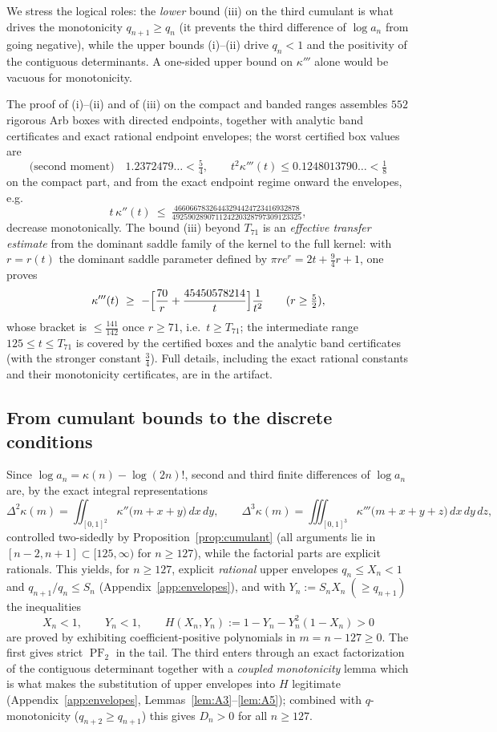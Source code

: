 \documentclass[11pt]{amsart}
\theoremstyle{definition}
\theoremstyle{remark}
\DeclareMathOperator{\PF}{PF}
\begin{document}
We stress the logical roles: the \emph{lower} bound (iii) on the third
cumulant is what drives the monotonicity $q_{n+1}\ge q_n$ (it prevents
the third difference of $\log a_n$ from going negative), while the
upper bounds (i)--(ii) drive $q_n<1$ and the positivity of the
contiguous determinants. A one-sided upper bound on $\kappa'''$ alone
would be vacuous for monotonicity.

The proof of (i)--(ii) and of (iii) on the compact and banded ranges
assembles $552$ rigorous Arb boxes with directed endpoints, together
with analytic band certificates and exact rational endpoint envelopes;
the worst certified box values are
\[
\text{(second moment)}\quad 1.2372479\ldots<\tfrac54,
\qquad
t^2\kappa'''(t)\le 0.1248013790\ldots<\tfrac18
\]
on the compact part, and from the exact endpoint regime onward the
envelopes, e.g.
\[
t\,\kappa''(t)\ \le\
\tfrac{46606678326443294424723416932878}
{492590289071124220328797309123325},
\]
decrease monotonically. The bound (iii) beyond $T_{71}$ is an
\emph{effective transfer estimate} from the dominant saddle family of
the kernel to the full kernel: with $r=r(t)$ the dominant saddle
parameter defined by $\pi r e^{r}=2t+\tfrac94 r+1$, one proves
\[
\kappa'''(t)\ \ge\ -\Bigl[\frac{70}{r}+\frac{45450578214}{t}\Bigr]
\frac{1}{t^{2}}\qquad (r\ge\tfrac52),
\]
whose bracket is $\le\frac{141}{142}$ once $r\ge 71$, i.e.\ $t\ge
T_{71}$; the intermediate range $125\le t\le T_{71}$ is covered by the
certified boxes and the analytic band certificates (with the stronger
constant $\tfrac34$). Full details, including the exact rational
constants and their monotonicity certificates, are in the artifact.

\subsection{From cumulant bounds to the discrete conditions}
Since $\log a_n=\kappa(n)-\log(2n)!$, second and third finite
differences of $\log a_n$ are, by the exact integral representations
\[
\Delta^2\kappa(m)
=\iint_{[0,1]^2}\kappa''\bigl(m+x+y\bigr)\,dx\,dy,
\qquad
\Delta^3\kappa(m)
=\iiint_{[0,1]^3}\kappa'''\bigl(m+x{+}y{+}z\bigr)\,dx\,dy\,dz,
\]
controlled two-sidedly by Proposition~\ref{prop:cumulant} (all
arguments lie in $[n-2,n+1]\subset[125,\infty)$ for $n\ge 127$), while
the factorial parts are explicit rationals. This yields, for
$n\ge127$, explicit \emph{rational} upper envelopes $q_n\le X_n<1$ and
$q_{n+1}/q_n\le S_n$ (Appendix~\ref{app:envelopes}), and with
$Y_n:=S_nX_n\ (\ge q_{n+1})$ the inequalities
\[
X_n<1,\qquad Y_n<1,\qquad H(X_n,Y_n):=1-Y_n-Y_n^{2}(1-X_n)>0
\]
are proved by exhibiting coefficient-positive polynomials in
$m=n-127\ge 0$. The first gives strict $\PF_2$ in the tail. The third
enters through an exact factorization of the contiguous determinant
together with a \emph{coupled monotonicity} lemma which is what makes
the substitution of upper envelopes into $H$ legitimate
(Appendix~\ref{app:envelopes}, Lemmas~\ref{lem:A3}--\ref{lem:A5});
combined with $q$-monotonicity ($q_{n+2}\ge q_{n+1}$) this gives
$D_n>0$ for all $n\ge127$.
\end{document}

